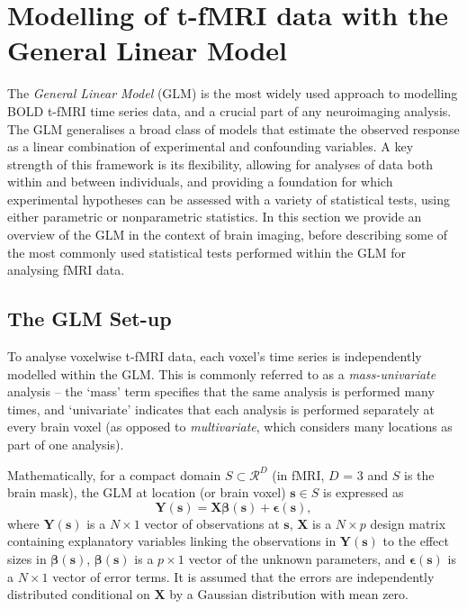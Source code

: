 \section{Modelling of t-fMRI data with the General Linear Model}

The \textit{General Linear Model} (GLM) is the most widely used approach to modelling BOLD t-fMRI time series data, and a crucial part of any neuroimaging analysis. The GLM generalises a broad class of models that estimate the observed response as a linear combination of experimental and confounding variables. A key strength of this framework is its flexibility, allowing for analyses of data both within and between individuals, and providing a foundation for which experimental hypotheses can be assessed with a variety of statistical tests, using either parametric or nonparametric statistics. In this section we provide an overview of the GLM in the context of brain imaging, before describing some of the most commonly used statistical tests performed within the GLM for analysing fMRI data.


\subsection{The GLM Set-up}
\label{sec:GLM}
To analyse voxelwise t-fMRI data, each voxel's time series is independently modelled within the GLM. This is commonly referred to as a \textit{mass-univariate} analysis -- the `mass' term specifies that the same analysis is performed many times, and `univariate' indicates that each analysis is performed separately at every brain voxel (as opposed to \textit{multivariate}, which considers many locations as part of one analysis). 

Mathematically, for a compact domain $S \subset \mathcal{R}^{D}$ (in fMRI, $D$ = 3 and $S$ is the brain mask), the GLM at location (or brain voxel) $\bm{s} \in S$ is expressed as
\begin{equation}
\label{eq:GLM}
\bm{Y}(\bm{s}) = \bm{X}\bm{\beta}(\bm{s}) + \bm{\epsilon}(\bm{s}),
\end{equation}
where $\bm{Y}(\bm{s})$ is a $N \times 1$ vector of observations at $\bm{s}$, $\bm{X}$ is a $N \times p$ design matrix containing explanatory variables linking the observations in $\bm{Y}(\bm{s})$ to the effect sizes in $\bm{\beta}(\bm{s})$, $\bm{\beta}(\bm{s})$ is a $p \times 1$ vector of the unknown parameters, and $\bm{\epsilon}(\bm{s})$ is a $N \times 1$ vector of error terms. It is assumed that the errors are independently distributed conditional on $\bm{X}$ by a Gaussian distribution with mean zero.

